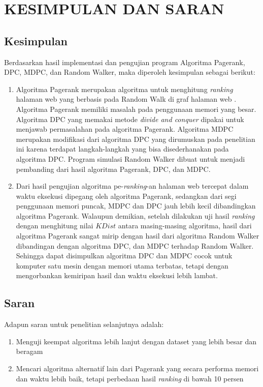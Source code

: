 
\chapter{KESIMPULAN DAN SARAN}

\section{Kesimpulan}
Berdasarkan hasil implementasi dan pengujian program Algoritma Pagerank, DPC, MDPC, dan Random Walker, maka diperoleh kesimpulan sebagai berikut:

\begin{enumerate}
	\item Algoritma Pagerank merupakan algoritma untuk menghitung \textit{ranking} halaman web yang berbasis pada Random Walk di graf halaman web \citep{ilprints422}. Algoritma Pagerank memiliki masalah pada penggunaan memori yang besar. Algoritma DPC yang memakai metode \textit{divide and conquer} \citep{zhuetal2005distributedPagerank} dipakai untuk menjawab permasalahan pada algoritma Pagerank. Algoritma MDPC merupakan modifikasi dari algoritma DPC yang dirumuskan pada penelitian ini karena terdapat langkah-langkah yang bisa disederhanakan pada algoritma DPC. Program simulasi Random Walker dibuat untuk menjadi pembanding dari hasil algoritma Pagerank, DPC, dan MDPC.
	
	\item Dari hasil pengujian algoritma pe-\textit{ranking}-an halaman web tercepat dalam waktu eksekusi dipegang oleh algoritma Pagerank, sedangkan dari segi penggunaan memori puncak, MDPC dan DPC jauh lebih kecil dibandingkan algoritma Pagerank. Walaupun demikian, setelah dilakukan uji hasil \textit{ranking} dengan menghitung nilai $KDist$ antara masing-masing algoritma, hasil dari algoritma Pagerank sangat mirip dengan hasil dari algoritma Random Walker dibandingan dengan algoritma DPC, dan MDPC terhadap Random Walker. Sehingga dapat disimpulkan algoritma DPC dan MDPC cocok untuk komputer satu mesin dengan memori utama terbatas, tetapi dengan mengorbankan kemiripan hasil dan waktu eksekusi lebih lambat.
\end{enumerate}

\section{Saran}
Adapun saran untuk penelitian selanjutnya adalah:
\begin{enumerate} 
	\item Menguji keempat algoritma lebih lanjut dengan dataset yang lebih besar dan beragam
    \item Mencari algoritma alternatif lain dari Pagerank yang secara performa memori dan waktu lebih baik, tetapi perbedaan hasil \textit{ranking} di bawah 10 persen
\end{enumerate}


\begin{comment}

\end{comment}